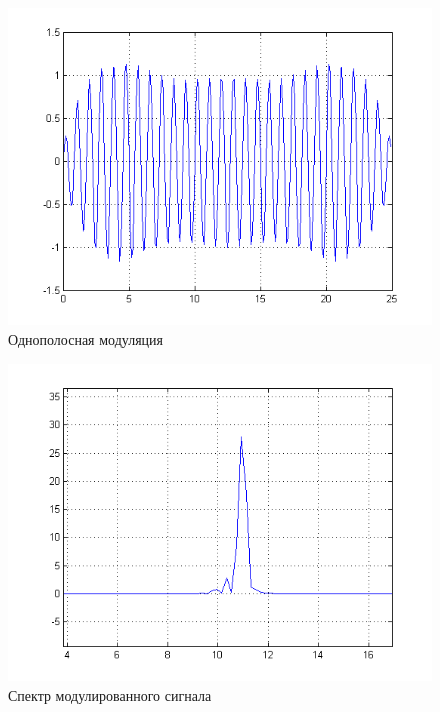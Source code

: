 \begin{figure}[H]
   \includegraphics[scale=0.7]{lab7/ssbmod.png}
   \caption{Однополосная модуляция}
\end{figure}

\begin{figure}[H]
   \includegraphics[scale=0.7]{lab7/ssbmod_spectro.png}
   \caption{Спектр модулированного сигнала}
\end{figure}

